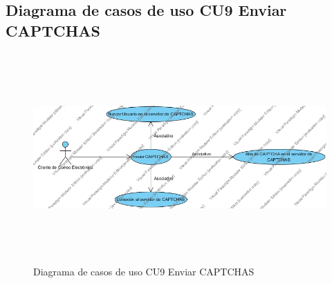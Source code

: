 \documentclass[12pt,oneside,onecolumn,openany]{report}
\begin{document}
\pagebreak
\subsection{Diagrama de casos de uso CU9 Enviar CAPTCHAS}
\begin{figure}[H]
	\includegraphics[width=1\linewidth, height=8cm]{./images/casodeuso9.jpg}
	\caption{Diagrama de casos de uso CU9 Enviar CAPTCHAS}
	\label{fig:4-10-1}
\end{figure}
\end{document}
